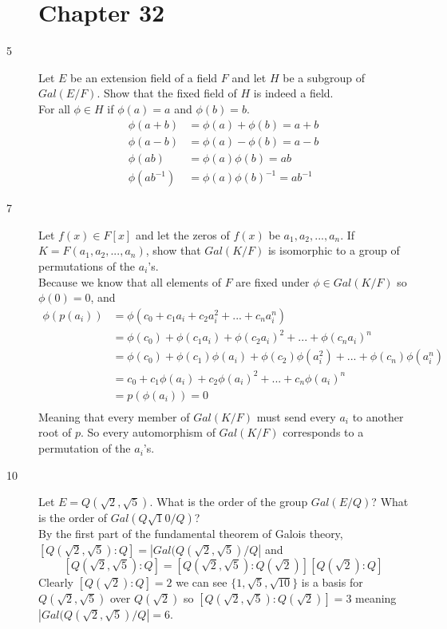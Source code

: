 \documentclass[11pt]{article}
\begin{document}
\begin{description}
\section{Chapter 32}
\item[5] Let $E$ be an extension field of a field $F$ and let $H$ be a subgroup
	of $Gal(E/F)$. Show that the fixed field of $H$ is indeed a field.\\
	For all $\phi \in H$ if $\phi(a) = a$ and $\phi(b) = b$.
	\begin{align*}
		\phi(a+b) &= \phi(a)+\phi(b) = a + b\\
		\phi(a-b) &= \phi(a)-\phi(b) = a - b\\
		\phi(ab) &= \phi(a)\phi(b) = a b\\
		\phi(ab^{-1}) &= \phi(a)\phi(b)^{-1} = ab^{-1}
	\end{align*}
\item[7]
	Let $f(x) \in F[x]$ and let the zeros of $f(x)$ be $a_1,a_2,...,a_n$. If
	$K = F(a_1,a_2,...,a_n)$, show that $Gal(K/F)$ is isomorphic to a group
	of permutations of the $a_i$'s. \\
	Because we know that all elements of $F$ are fixed under $\phi\in
	Gal(K/F)$ so $\phi(0) = 0$, and 
	\begin{align*}
		\phi(p(a_i))& = \phi(c_0 +c_1a_i+c_2a_i^2 +...+ c_na_i^n) \\
			& = \phi(c_0)
			+\phi(c_1a_i)+\phi(c_2a_i)^2+...+\phi(c_na_i)^n \\
			& = \phi(c_0) +\phi(c_1) \phi(a_i)+\phi(c_2)\phi(a_i^2)+...+\phi(c_n)\phi(a_i^n) \\
			& = c_0 +c_1 \phi(a_i)+c_2\phi(a_i)^2+...+c_n\phi(a_i)^n
			\\
			& = p(\phi(a_i)) = 0\\
	\end{align*}
	Meaning that every member of $Gal(K/F)$ must send every $a_i$ to
	another root of $p$. So every automorphism of $Gal(K/F)$ corresponds to
	a permutation of the $a_i$'s.
\item[10] Let $E= Q(\sqrt2,\sqrt5)$. What is the order of the group $Gal(E/Q)$?
	What is the order of $Gal(Q\sqrt10/Q)$?\\
	By the first part of the fundamental theorem of Galois theory,
	$[Q(\sqrt2,\sqrt5):Q] = |Gal(Q(\sqrt2,\sqrt5)/Q| $ and 
	$$[Q(\sqrt2,\sqrt5):Q] = [Q(\sqrt2,\sqrt5):Q(\sqrt2)] [Q(\sqrt2):Q] $$
	Clearly $[Q(\sqrt2):Q] =2 $  we can see $\{1,\sqrt5,\sqrt{10}\}$ is a
	basis for $Q(\sqrt2,\sqrt5)$ over $Q(\sqrt2)$ so $[Q(\sqrt2,\sqrt5):Q(\sqrt2)]=3 $
	meaning 
	$|Gal(Q(\sqrt2,\sqrt5)/Q| = 6$.

\end{description}
\end{document}
